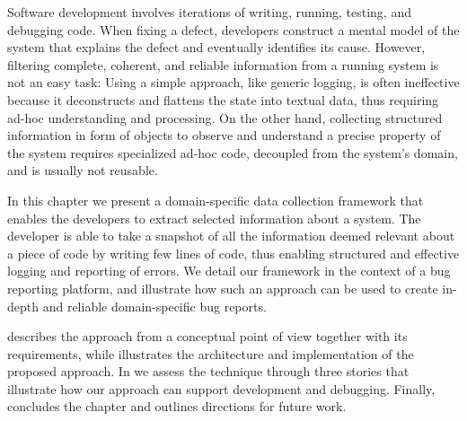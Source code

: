 



Software development involves iterations of writing, running, testing, and debugging code.
When fixing a defect, developers construct a mental model of the system that explains the defect and eventually identifies its cause.
However, filtering complete, coherent, and reliable information from a running system is not an easy task: Using a simple approach, like generic logging, is often ineffective because it deconstructs and flattens the state into textual data, thus requiring ad-hoc understanding and processing.
On the other hand, collecting structured information in form of objects to observe and understand a precise property of the system requires specialized ad-hoc code, decoupled from the system's domain, and is usually not reusable.

In this chapter we present a domain-specific data collection framework that enables the developers to extract selected information about a system.
The developer is able to take a snapshot of all the information deemed relevant about a piece of code by writing few lines of code, thus enabling structured and effective logging and reporting of errors.
We detail our framework in the context of a bug reporting platform, and illustrate how such an approach can be used to create in-depth and reliable domain-specific bug reports.

\structure

 describes the approach from a conceptual point of view together with its requirements, while  illustrates the architecture and implementation of the proposed approach.
In  we assess the technique through three stories that illustrate how our approach can support development and debugging.
Finally,  concludes the chapter and outlines directions for future work.



